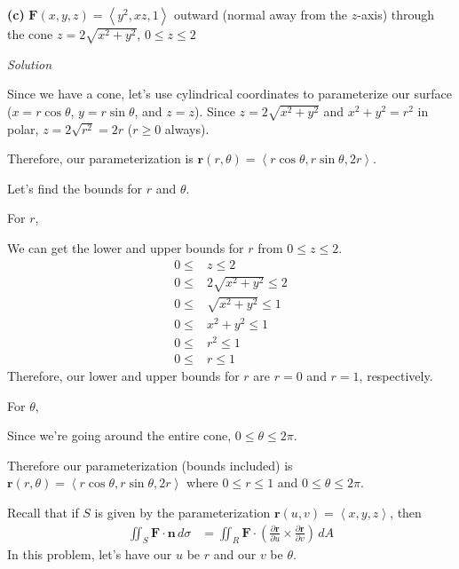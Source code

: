 \documentclass{article}
\newcommand{\lrp}[1]{\left( #1 \right)}
\newcommand{\lra}[1]{\left\langle #1 \right\rangle}
\renewcommand{\r}[0]{\mathbf{r}}
\newcommand{\F}[0]{\mathbf{F}}
\newcommand{\n}[0]{\mathbf{n}}
\newcommand{\Solution}{\textit{Solution}}
\begin{document}
{}\textbf{(c)} $\F(x,y,z)=\lra{y^2,xz,1}$ outward (normal away from the $z$-axis) through the cone $z=2\sqrt{x^2+y^2}$, $0\leq z\leq 2$

\Solution

Since we have a cone, let's use cylindrical coordinates to parameterize our surface ($x=r\cos\theta$, $y=r\sin\theta$, and $z=z$). Since $z=2\sqrt{x^2+y^2}$ and $x^2+y^2=r^2$ in polar, $z=2\sqrt{r^2}=2r$ ($r\geq 0$ always). 

Therefore, our parameterization is $\r(r,\theta)=\lra{r\cos\theta, r\sin\theta, 2r}$.

Let's find the bounds for $r$ and $\theta$.

For $r$,

We can get the lower and upper bounds for $r$ from $0\leq z\leq 2$.
\begin{align*}
    0\leq &z \leq 2\\
    0 \leq & 2\sqrt{x^2+y^2}\leq 2\\
    0 \leq & \sqrt{x^2+y^2}\leq 1\\
    0 \leq & x^2+y^2 \leq 1\\
    0 \leq & r^2\leq 1\tag{in polar, $x^2+y^2=r^2$}\\
    0 \leq & r\leq 1\tag{$r\geq 0$ always}
\end{align*}
Therefore, our lower and upper bounds for $r$ are $r=0$ and $r=1$, respectively.

For $\theta$,

Since we're going around the entire cone, $0\leq \theta\leq 2\pi$.

Therefore our parameterization (bounds included) is $\r(r,\theta)=\lra{r\cos\theta, r\sin\theta, 2r}$ where $0\leq r\leq 1$ and $0\leq \theta\leq 2\pi$.

Recall that if $S$ is given by the parameterization $\r(u,v)=\lra{x,y,z}$, then
\begin{align*}
    \iint_S \F\cdot \n \,d\sigma &= \iint_R \F \cdot \lrp{\frac{\partial \r}{\partial u}\times \frac{\partial \r}{\partial v}}\,dA
\end{align*}
In this problem, let's have our $u$ be $r$ and our $v$ be $\theta$.
\end{document}
